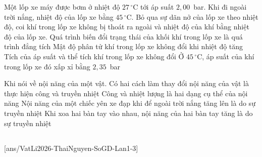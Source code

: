 	\begin{ex}%
		Một lốp xe máy được bơm ở nhiệt độ $27\,^\circ\text{C}$ tới áp suất $2{,}00$~bar. Khi đi ngoài trời nắng, nhiệt độ của lốp xe bằng $45\,^\circ\text{C}$. Bỏ qua sự dãn nở của lốp xe theo nhiệt độ, coi khí trong lốp xe không bị thoát ra ngoài và nhiệt độ của khí bằng nhiệt độ của lốp xe.
		\choiceTFt
		{\True Quá trình biến đổi trạng thái của khối khí trong lốp xe là quá trình đẳng tích}
		{\True Mật độ phân tử khí trong lốp xe không đổi khi nhiệt độ tăng}
		{Tích của áp suất và thể tích khí trong lốp xe không đổi}
		{Ở $45\,^\circ\text{C}$, áp suất của khí trong lốp xe đó xấp xỉ bằng $2{,}35$~bar}
	\end{ex}

	\begin{ex}%
		Khi nói về nội năng của một vật.
		\choiceTFt
		{\True Có hai cách làm thay đổi nội năng của vật là thực hiện công và truyền nhiệt}
		{Công và nhiệt lượng là hai dạng cụ thể của nội năng}
		{\True Nội năng của một chiếc yên xe đạp khi để ngoài trời nắng tăng lên là do sự truyền nhiệt}
		{Khi xoa hai bàn tay vào nhau, nội năng của hai bàn tay tăng là do sự truyền nhiệt}
	\end{ex}

	\subsection*{}
	\setcounter{ex}{0}
	[ans/VatLi2026-ThaiNguyen-SoGD-Lan1-3]


